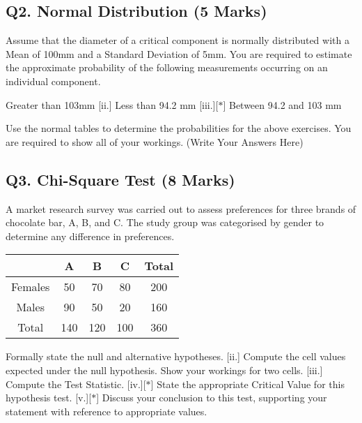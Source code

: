 \subsection*{Q2. Normal Distribution (5 Marks)} %
Assume that the diameter of a critical component is normally distributed with a Mean of 100mm and a Standard Deviation of 5mm. You are required  to estimate the approximate probability of the following measurements occurring on an individual component.
\begin{itemize}
 [i.]	Greater than 103mm
 [ii.] Less than 94.2 mm
 [iii.][$\ast$] Between 94.2 and 103 mm
\end{itemize}
\bigskip
\noindent Use the normal tables to determine the probabilities for the above exercises. You are required to show all of your workings.
\newpage
(Write Your Answers Here)
\newpage

\subsection*{Q3. Chi-Square Test (8 Marks)} %

A market research survey was carried out to assess preferences for three brands of chocolate bar, A, B, and C. 
The study group was categorised by gender to determine any difference in preferences.


{
	\large
	\begin{center}
		\begin{tabular}{|c|c|c|c|c|}
			\hline
			& A & B & C &  Total\\ \hline
			Females & 50 & 70 & 80 & 200 \\ \hline
			Males   & 90 & 50 & 20 &  160\\ \hline
			Total & 140 & 120 & 100 & 360\\ \hline
		\end{tabular} 
	\end{center}
}
\begin{itemize}
[i.][$\ast$] Formally state the null and alternative hypotheses.
[ii.]  Compute the cell values expected under the null hypothesis. Show your workings for two cells.
[iii.] Compute the Test Statistic.
[iv.][$\ast$] State the appropriate Critical Value for this hypothesis test.
[v.][$\ast$] Discuss your conclusion to this test, supporting your statement with reference to appropriate values.
\end{itemize}



\newpage

